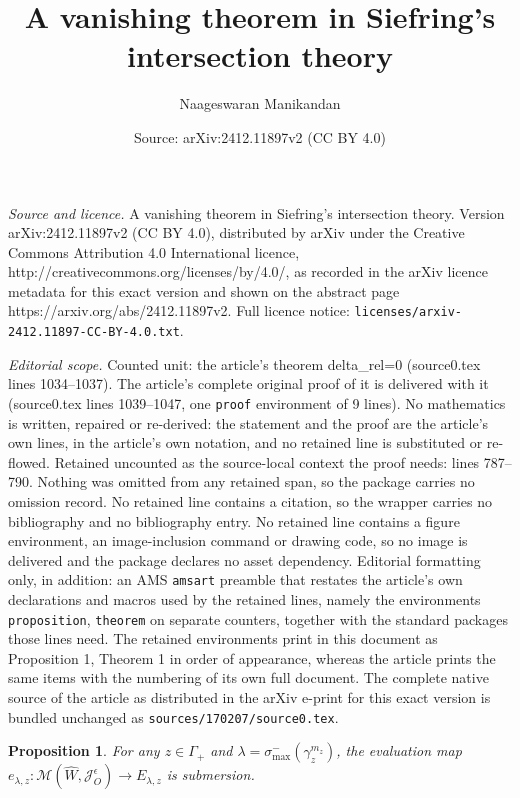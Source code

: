 \documentclass[10pt,a4paper]{amsart}
\title{A vanishing theorem in Siefring's intersection theory}
\author{Naageswaran Manikandan}
\date{Source: arXiv:2412.11897v2 (CC BY 4.0)}
\newtheorem{proposition}{Proposition}
\newcommand{\cJ}{\mathcal{J}}
\newcommand{\cM}{\mathcal{M}}
\begin{document}
\maketitle

\noindent\emph{Source and licence.} A vanishing theorem in Siefring's intersection theory. Version arXiv:2412.11897v2 (CC BY 4.0), distributed by arXiv under the Creative Commons Attribution 4.0 International licence, http://creativecommons.org/licenses/by/4.0/, as recorded in the arXiv licence metadata for this exact version and shown on the abstract page https://arxiv.org/abs/2412.11897v2. Full licence notice: \texttt{licenses/arxiv-2412.11897-CC-BY-4.0.txt}.\par\smallskip

\noindent\textit{Editorial scope.} Counted unit: the article's theorem delta\_rel=0 (source0.tex lines 1034--1037). The article's complete original proof of it is delivered with it (source0.tex lines 1039--1047, one \texttt{proof} environment of 9 lines). No mathematics is written, repaired or re-derived: the statement and the proof are the article's own lines, in the article's own notation, and no retained line is substituted or re-flowed.  Retained uncounted as the source-local context the proof needs: lines 787--790.  Nothing was omitted from any retained span, so the package carries no omission record.  No retained line contains a citation, so the wrapper carries no bibliography and no bibliography entry.  No retained line contains a figure environment, an image-inclusion command or drawing code, so no image is delivered and the package declares no asset dependency.  Editorial formatting only, in addition: an AMS \texttt{amsart} preamble that restates the article's own declarations and macros used by the retained lines, namely the environments \texttt{proposition}, \texttt{theorem} on separate counters, together with the standard packages those lines need.  The retained environments print in this document as Proposition 1, Theorem 1 in order of appearance, whereas the article prints the same items with the numbering of its own full document.  The complete native source of the article as distributed in the arXiv e-print for this exact version is bundled unchanged as \texttt{sources/170207/source0.tex}.
\begin{proposition}   
\label{regularity of evaluation map}
For any $z\in \Gamma_+$ and $\lambda = \sigma_{\max}^-(\gamma_z^{m_z})$, the evaluation map $e_{\lambda,z}\colon \cM(\widehat{W},\cJ^{\epsilon}_O) \rightarrow E_{\lambda,z}$ is submersion.
\end{proposition}
\end{document}
